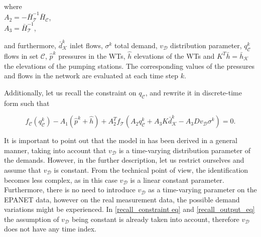 \begin{minipage}[t]{0.4\textwidth}
where\\
\hspace*{8mm} $A_2 = -\bar{H}^{-1}_{\mathcal{T}} \bar{H}_{\mathcal{C}} $, \vspace*{1.5mm}\\
\hspace*{8mm} $A_3 = \bar{H}^{-1}_{\mathcal{T}}$,
\end{minipage}

and furthermore, $\bar{d}^{k}_{\mathcal{K}}$ inlet flows, $\sigma^{k}$ total demand, $v_{\mathcal{D}}$ distribution parameter, $q^{k}_{\mathcal{C}}$ flows in set $\mathcal{C}$, $\hat{p}^{k}$ pressures in the WTs, $\hat{h}$ elevations of the WTs and $K^T\bar{h} = \bar{h}_{\mathcal{K}} $ the elevations of the pumping stations. The corresponding values of the pressures and flows in the network are evaluated at each time step $k$. 

Additionally, let us recall the constraint on $q_\mathcal{C}$, and rewrite it in discrete-time form such that

 \begin{equation}
\label{recall_constraint eq}
f_{\mathcal{C}}(q^{k}_{\mathcal{C}}) - A_1(\hat{p}^{k} + \hat{h}) + A_2^T f_{\mathcal{T}}(A_2 q^{k}_{\mathcal{C}} + A_3 K \bar{d}^{k}_{\mathcal{K}} - A_3 D v_{\mathcal{D}} \sigma^{k}) = 0.
\end{equation} 

It is important to point out that the model in  has been derived in a general manner, taking into account that $v_{\mathcal{D}}$ is a time-varying distribution parameter of the demands. However, in the further description, let us restrict ourselves and assume that $v_{\mathcal{D}}$ is constant.  From the technical point of view, the identification becomes less complex, as in this case $v_{\mathcal{D}}$ is a linear constant parameter. Furthermore, there is no need to introduce $v_{\mathcal{D}}$ as a time-varying parameter on the EPANET data, however on the real measurement data, the possible demand variations might be experienced. In \eqref{recall_constraint eq} and \eqref{recall_output_eq} the assumption of $v_{\mathcal{D}}$ being constant is already taken into account, therefore $v_{\mathcal{D}}$ does not have any time index.


